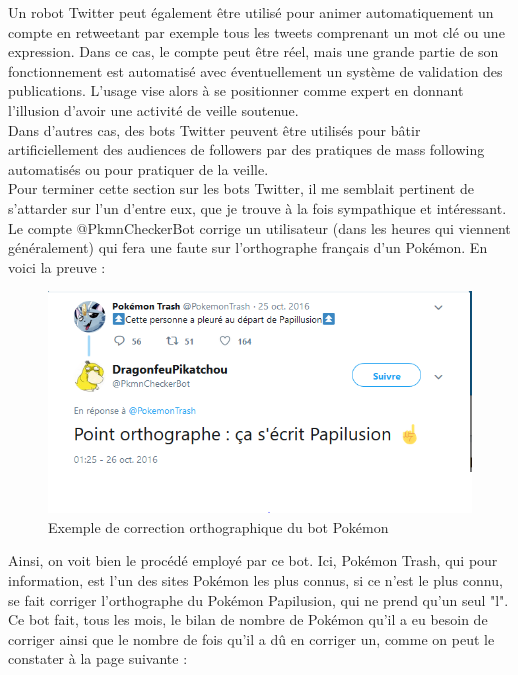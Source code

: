 \documentclass[12pt]{report}
\begin{document}
Un robot Twitter peut également être utilisé pour animer automatiquement un compte en retweetant par exemple tous les tweets comprenant un mot clé ou une expression. Dans ce cas, le compte peut être réel, mais une grande partie de son fonctionnement est automatisé avec éventuellement un système de validation des publications. L’usage vise alors à se positionner comme expert en donnant l’illusion d’avoir une activité de veille soutenue. \\

Dans d’autres cas, des bots Twitter peuvent être utilisés pour bâtir artificiellement des audiences de followers par des pratiques de mass following automatisés ou pour pratiquer de la veille. \\

Pour terminer cette section sur les bots Twitter, il me semblait pertinent de s'attarder sur l'un d'entre eux, que je trouve à la fois sympathique et intéressant. Le compte @PkmnCheckerBot corrige un utilisateur (dans les heures qui viennent généralement) qui fera une faute sur l'orthographe français d'un Pokémon. En voici la preuve : 

\begin{figure}[h]
    \includegraphics[width=180mm]{BotTwitterPokemon2.PNG}
    \caption{Exemple de correction orthographique du bot Pokémon}
\label{fig:Exemple de correction orthographique du bot Pokémon}
  \end{figure}
  
Ainsi, on voit bien le procédé employé par ce bot. Ici, Pokémon Trash, qui pour information, est l'un des sites Pokémon les plus connus, si ce n'est le plus connu, se fait corriger l'orthographe du Pokémon Papilusion, qui ne prend qu'un seul "l". Ce bot fait, tous les mois, le bilan de nombre de Pokémon qu'il a eu besoin de corriger ainsi que le nombre de fois qu'il a dû en corriger un, comme on peut le constater à la page suivante :
\end{document}
